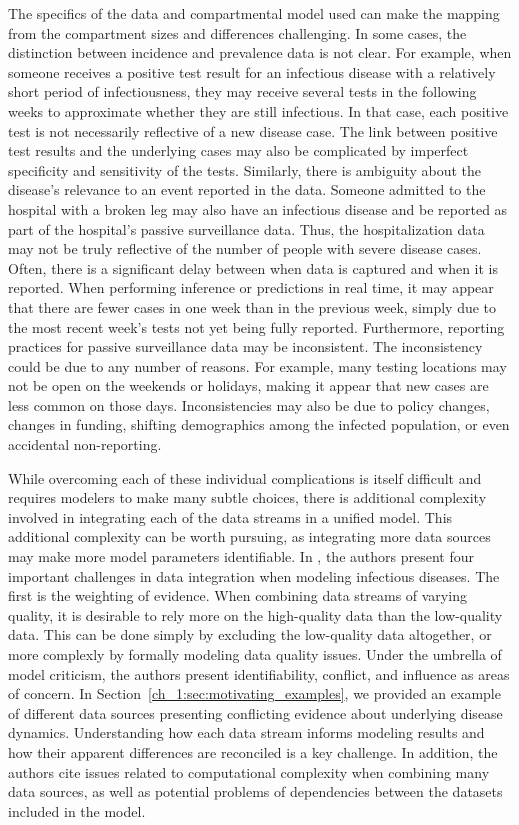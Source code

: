 The specifics of the data and compartmental model used can make the mapping from the compartment sizes and differences challenging.
In some cases, the distinction between incidence and prevalence data is not clear.
For example, when someone receives a positive test result for an infectious disease with a relatively short period of infectiousness, they may receive several tests in the following weeks to approximate whether they are still infectious.
In that case, each positive test is not necessarily reflective of a new disease case.
The link between positive test results and the underlying cases may also be complicated by imperfect specificity and sensitivity of the tests.
Similarly, there is ambiguity about the disease's relevance to an event reported in the data.
Someone admitted to the hospital with a broken leg may also have an infectious disease and be reported as part of the hospital's passive surveillance data.
Thus, the hospitalization data may not be truly reflective of the number of people with severe disease cases.
Often, there is a significant delay between when data is captured and when it is reported.
When performing inference or predictions in real time, it may appear that there are fewer cases in one week than in the previous week, simply due to the most recent week's tests not yet being fully reported.
Furthermore, reporting practices for passive surveillance data may be inconsistent.
The inconsistency could be due to any number of reasons.
For example, many testing locations may not be open on the weekends or holidays, making it appear that new cases are less common on those days.
Inconsistencies may also be due to policy changes, changes in funding, shifting demographics among the infected population, or even accidental non-reporting.

While overcoming each of these individual complications is itself difficult and requires modelers to make many subtle choices, there is additional complexity involved in integrating each of the data streams in a unified model.
This additional complexity can be worth pursuing, as integrating more data sources may make more model parameters identifiable.
In \citet{DeAngelis2015four}, the authors present four important challenges in data integration when modeling infectious diseases.
The first is the weighting of evidence.
When combining data streams of varying quality, it is desirable to rely more on the high-quality data than the low-quality data.
This can be done simply by excluding the low-quality data altogether, or more complexly by formally modeling data quality issues.
Under the umbrella of model criticism, the authors present identifiability, conflict, and influence as areas of concern.
In Section~\ref{ch_1:sec:motivating_examples}, we provided an example of different data sources presenting conflicting evidence about underlying disease dynamics.
Understanding how each data stream informs modeling results and how their apparent differences are reconciled is a key challenge.
In addition, the authors cite issues related to computational complexity when combining many data sources, as well as potential problems of dependencies between the datasets included in the model.

